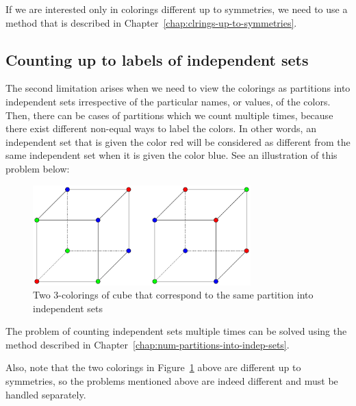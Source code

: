 If we are interested only in colorings different up to symmetries, we need to use a method that is described in Chapter~\ref{chap:clrings-up-to-symmetries}.

\subsection{Counting up to labels of independent sets}

The second limitation arises when we need to view the colorings as partitions into independent sets irrespective of the particular names, or values, of the colors. Then, there can be cases of partitions which we count multiple times, because there exist different non-equal ways to label the colors. In other words, an independent set that is given the color red will be considered as different from the same independent set when it is given the color blue. See an illustration of this problem below:

\begin{figure}[H]
    \centering
    \includegraphics[width=0.75\textwidth]{Resources/Figs/cube_relabelings_problem.pdf}
    \caption{Two 3-colorings of cube that correspond to the same partition into independent sets}
    \label{fig:cube-clrings-same-partition}
\end{figure}

The problem of counting independent sets multiple times can be solved using the method described in Chapter~\ref{chap:num-partitions-into-indep-sets}. 

Also, note that the two colorings in Figure~\ref{fig:cube-clrings-same-partition} above are different up to symmetries, so the problems mentioned above are indeed different and must be handled separately.

